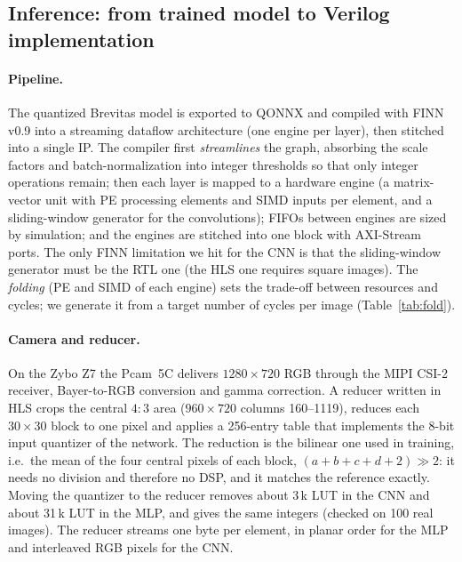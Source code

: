 \documentclass{article}
\begin{document}
\subsection{Inference: from trained model to Verilog implementation}
\label{sec:flow}
\paragraph{Pipeline.} The quantized Brevitas model is exported to QONNX and compiled with FINN v0.9 into a streaming dataflow architecture
(one engine per layer), then stitched into a single IP. The compiler first \emph{streamlines} the graph, absorbing the scale factors and batch-normalization into
integer thresholds so that only integer operations remain; then each layer is mapped to a hardware engine (a matrix-vector unit with PE processing elements and SIMD inputs per element,
and a sliding-window generator for the convolutions); FIFOs between engines are sized by simulation; and the engines are stitched into one block with AXI-Stream
ports. The only FINN limitation we hit for the CNN is that the sliding-window generator
must be the RTL one (the HLS one requires square images). The \emph{folding} (PE and SIMD of each engine) sets the trade-off between resources and cycles; we generate it from a target
number of cycles per image (Table~\ref{tab:fold}).

\paragraph{Camera and reducer.} On the Zybo Z7 the Pcam~5C delivers $1280{\times}720$ RGB through the MIPI CSI-2 receiver, Bayer-to-RGB
conversion and gamma correction. A reducer written in HLS crops the central $4{:}3$ area ($960{\times}720$ columns 160--1119), reduces each $30{\times}30$ block to one pixel
and applies a 256-entry table that implements the 8-bit input quantizer of the network. The reduction is the bilinear one used in training, i.e.\ the mean of the
four central pixels of each block, $(a+b+c+d+2)\gg2$: it needs no division and therefore no DSP, and it matches the reference exactly. Moving the quantizer
to the reducer removes about 3\,k LUT in the CNN and about 31\,k LUT in the MLP, and gives the same integers (checked on 100 real images).
The reducer streams one byte per element, in planar order for the MLP and interleaved RGB pixels for the CNN.
\end{document}

